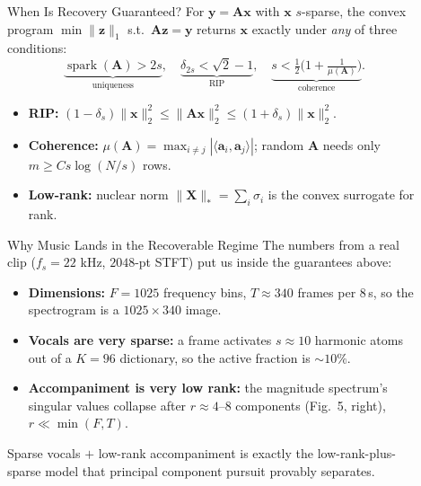 \documentclass[final,17pt]{beamer}
\newcommand{\lead}[1]{\textbf{\color{dgreen}#1}}
\newcommand{\norm}[1]{\lVert#1\rVert}
\DeclareMathOperator{\spark}{spark}
\newlength{\sepwidth}\newlength{\colwidth}
\newcommand{\separatorcolumn}{\begin{column}{\sepwidth}\end{column}}
\begin{document}
\begin{frame}[t]
\begin{columns}[t]
\begin{column}{\colwidth}
\begin{block}{When Is Recovery Guaranteed?}
For $\bm{y}=\bm{A}\bm{x}$ with $\bm{x}$ $s$-sparse, the convex program
$\min\norm{\bm{z}}_1$ s.t.\ $\bm{A}\bm{z}=\bm{y}$ returns $\bm{x}$ exactly under
\emph{any} of three conditions:
\[ \underbrace{\spark(\bm{A})>2s}_{\text{uniqueness}},\quad
   \underbrace{\delta_{2s}<\sqrt2-1}_{\text{RIP}},\quad
   \underbrace{s<\tfrac12\!\big(1+\tfrac1{\mu(\bm{A})}\big)}_{\text{coherence}}. \]
\begin{itemize}
\item \lead{RIP:} $(1-\delta_s)\norm{\bm{x}}_2^2\le\norm{\bm{A}\bm{x}}_2^2\le(1+\delta_s)\norm{\bm{x}}_2^2$.
\item \lead{Coherence:} $\mu(\bm{A})=\max_{i\ne j}|\langle\bm{a}_i,\bm{a}_j\rangle|$; random
$\bm{A}$ needs only $m\!\ge\!Cs\log(N/s)$ rows.
\item \lead{Low-rank:} nuclear norm $\norm{\bm{X}}_*\!=\!\sum_i\sigma_i$ is the convex
surrogate for rank.
\end{itemize}
\end{block}

\begin{block}{Why Music Lands in the Recoverable Regime}
The numbers from a real clip ($f_s\!=\!22$ kHz, $2048$-pt STFT) put us inside the
guarantees above:
\begin{itemize}
\item \lead{Dimensions:} $F\!=\!1025$ frequency bins, $T\!\approx\!340$ frames per
$8$\,s, so the spectrogram is a $1025\!\times\!340$ image.
\item \lead{Vocals are very sparse:} a frame activates $s\!\approx\!10$ harmonic
atoms out of a $K\!=\!96$ dictionary, so the active fraction is $\sim\!10\%$.
\item \lead{Accompaniment is very low rank:} the magnitude spectrum's singular
values collapse after $r\!\approx\!4$--$8$ components (Fig.~5, right), $r\!\ll\!\min(F,T)$.
\end{itemize}
Sparse vocals $+$ low-rank accompaniment is exactly the low-rank-plus-sparse model
that principal component pursuit provably separates.
\end{block}

\end{column}
\separatorcolumn

\begin{column}{\colwidth}


\end{column}
\end{columns}
\end{frame}
\end{document}
